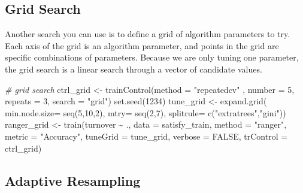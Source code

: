 \documentclass[
]{book}
\newenvironment{Shaded}{\begin{snugshade}}{\end{snugshade}}
\newcommand{\AttributeTok}[1]{\textcolor[rgb]{0.77,0.63,0.00}{#1}}
\newcommand{\CommentTok}[1]{\textcolor[rgb]{0.56,0.35,0.01}{\textit{#1}}}
\newcommand{\ConstantTok}[1]{\textcolor[rgb]{0.00,0.00,0.00}{#1}}
\newcommand{\DecValTok}[1]{\textcolor[rgb]{0.00,0.00,0.81}{#1}}
\newcommand{\FunctionTok}[1]{\textcolor[rgb]{0.00,0.00,0.00}{#1}}
\newcommand{\NormalTok}[1]{#1}
\newcommand{\OtherTok}[1]{\textcolor[rgb]{0.56,0.35,0.01}{#1}}
\newcommand{\SpecialCharTok}[1]{\textcolor[rgb]{0.00,0.00,0.00}{#1}}
\newcommand{\StringTok}[1]{\textcolor[rgb]{0.31,0.60,0.02}{#1}}
\begin{document}
\hypertarget{grid-search-1}{%
\subsection{Grid Search}\label{grid-search-1}}

Another search you can use is to define a grid of algorithm parameters to try. Each axis of the grid is an algorithm parameter, and points in the grid are specific combinations of parameters.
Because we are only tuning one parameter, the grid search is a linear search through a vector of candidate values.

\begin{Shaded}
\begin{Highlighting}[]
\CommentTok{\# grid search}
\NormalTok{ctrl\_grid }\OtherTok{\textless{}{-}} \FunctionTok{trainControl}\NormalTok{(}\AttributeTok{method =} \StringTok{"repeatedcv"}\NormalTok{ , }\AttributeTok{number =} \DecValTok{5}\NormalTok{, }
                          \AttributeTok{repeats =} \DecValTok{3}\NormalTok{, }
                          \AttributeTok{search =} \StringTok{"grid"}\NormalTok{)}
\FunctionTok{set.seed}\NormalTok{(}\DecValTok{1234}\NormalTok{)}
\NormalTok{tune\_grid }\OtherTok{\textless{}{-}} \FunctionTok{expand.grid}\NormalTok{( }\AttributeTok{min.node.size=} \FunctionTok{seq}\NormalTok{(}\DecValTok{5}\NormalTok{,}\DecValTok{10}\NormalTok{,}\DecValTok{2}\NormalTok{), }
                         \AttributeTok{mtry=} \FunctionTok{seq}\NormalTok{(}\DecValTok{2}\NormalTok{,}\DecValTok{7}\NormalTok{),}
                         \AttributeTok{splitrule=} \FunctionTok{c}\NormalTok{(}\StringTok{"extratrees"}\NormalTok{,}\StringTok{"gini"}\NormalTok{))}
\NormalTok{ranger\_grid }\OtherTok{\textless{}{-}} \FunctionTok{train}\NormalTok{(turnover }\SpecialCharTok{\textasciitilde{}}\NormalTok{ ., }\AttributeTok{data =}\NormalTok{ satisfy\_train, }\AttributeTok{method =} \StringTok{"ranger"}\NormalTok{, }
                  \AttributeTok{metric =} \StringTok{"Accuracy"}\NormalTok{, }\AttributeTok{tuneGrid =}\NormalTok{ tune\_grid, }
                  \AttributeTok{verbose =} \ConstantTok{FALSE}\NormalTok{,}
                  \AttributeTok{trControl =}\NormalTok{ ctrl\_grid)}
\end{Highlighting}
\end{Shaded}

\hypertarget{adaptive-resampling-1}{%
\subsection{Adaptive Resampling}\label{adaptive-resampling-1}}
\end{document}

